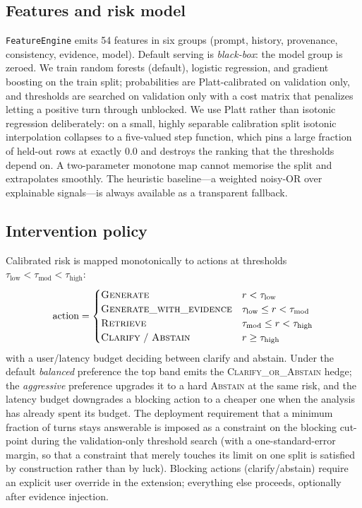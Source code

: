 \documentclass[conference,a4paper]{IEEEtran}
\begin{document}
\subsection{Features and risk model}
\texttt{FeatureEngine} emits 54 features in six groups (prompt, history,
provenance, consistency, evidence, model). Default serving is
\emph{black-box}: the model group is zeroed. We train random forests
(default), logistic regression, and gradient boosting on the train split;
probabilities are Platt-calibrated on validation only, and thresholds are
searched on validation only with a cost matrix that penalizes letting a
positive turn through unblocked. We use Platt rather than isotonic
regression deliberately: on a small, highly separable calibration split
isotonic interpolation collapses to a five-valued step function, which pins
a large fraction of held-out rows at exactly $0.0$ and destroys the ranking
that the thresholds depend on. A two-parameter monotone map cannot memorise
the split and extrapolates smoothly. The heuristic baseline---a weighted
noisy-OR over explainable signals---is always available as a transparent
fallback.

\subsection{Intervention policy}
Calibrated risk is mapped monotonically to actions at thresholds
$\tau_{\text{low}}<\tau_{\text{mod}}<\tau_{\text{high}}$:
\[
\text{action}=
\begin{cases}
\textsc{Generate} & r<\tau_{\text{low}}\\
\textsc{Generate\_with\_evidence} & \tau_{\text{low}}\le r<\tau_{\text{mod}}\\
\textsc{Retrieve} & \tau_{\text{mod}}\le r<\tau_{\text{high}}\\
\textsc{Clarify}\ /\ \textsc{Abstain} & r\ge\tau_{\text{high}}
\end{cases}
\]
with a user/latency budget deciding between clarify and abstain. Under the
default \emph{balanced} preference the top band emits the
\textsc{Clarify\_or\_Abstain} hedge; the \emph{aggressive} preference upgrades
it to a hard \textsc{Abstain} at the same risk, and the latency budget
downgrades a blocking action to a cheaper one when the analysis has already
spent its budget. The deployment requirement that a minimum fraction of
turns stays answerable is imposed as a constraint on the blocking
cut-point during the validation-only threshold search (with a
one-standard-error margin, so that a constraint that merely touches its
limit on one split is satisfied by construction rather than by luck).
Blocking
actions (clarify/abstain) require an explicit user override in the
extension; everything else proceeds, optionally after evidence injection.
\end{document}
